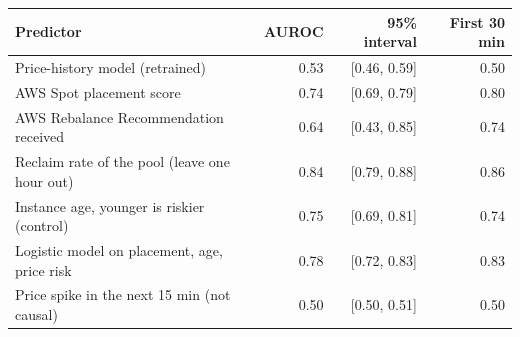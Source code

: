 \begin{tabular}{lrrr}
\toprule
Predictor & AUROC & 95\% interval & First 30 min \\
\midrule
Price-history model (retrained) & 0.53 & [0.46, 0.59] & 0.50 \\
AWS Spot placement score & 0.74 & [0.69, 0.79] & 0.80 \\
AWS Rebalance Recommendation received & 0.64 & [0.43, 0.85] & 0.74 \\
Reclaim rate of the pool (leave one hour out) & 0.84 & [0.79, 0.88] & 0.86 \\
Instance age, younger is riskier (control) & 0.75 & [0.69, 0.81] & 0.74 \\
Logistic model on placement, age, price risk & 0.78 & [0.72, 0.83] & 0.83 \\
Price spike in the next 15 min (not causal) & 0.50 & [0.50, 0.51] & 0.50 \\
\bottomrule
\end{tabular}
